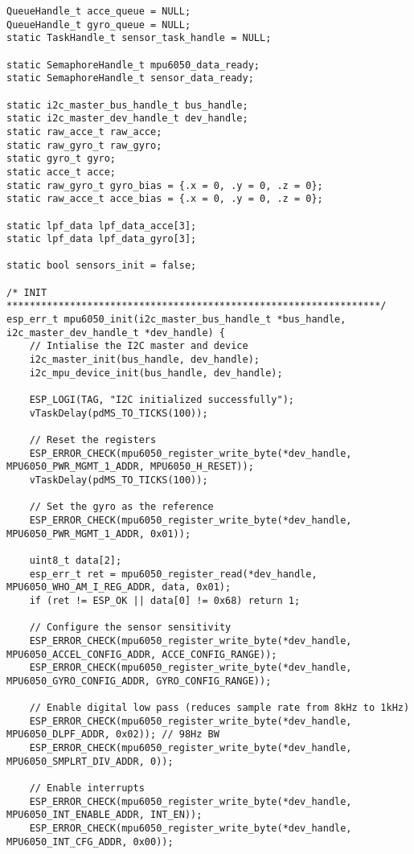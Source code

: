\begin{lstlisting}[caption={Register Read}]
QueueHandle_t acce_queue = NULL;
QueueHandle_t gyro_queue = NULL;
static TaskHandle_t sensor_task_handle = NULL;

static SemaphoreHandle_t mpu6050_data_ready;
static SemaphoreHandle_t sensor_data_ready;

static i2c_master_bus_handle_t bus_handle;
static i2c_master_dev_handle_t dev_handle;
static raw_acce_t raw_acce; 
static raw_gyro_t raw_gyro;
static gyro_t gyro;
static acce_t acce;
static raw_gyro_t gyro_bias = {.x = 0, .y = 0, .z = 0};
static raw_acce_t acce_bias = {.x = 0, .y = 0, .z = 0};

static lpf_data lpf_data_acce[3];
static lpf_data lpf_data_gyro[3];

static bool sensors_init = false;

/* INIT *****************************************************************/
esp_err_t mpu6050_init(i2c_master_bus_handle_t *bus_handle, i2c_master_dev_handle_t *dev_handle) {
    // Intialise the I2C master and device
    i2c_master_init(bus_handle, dev_handle);
    i2c_mpu_device_init(bus_handle, dev_handle);

    ESP_LOGI(TAG, "I2C initialized successfully");
    vTaskDelay(pdMS_TO_TICKS(100)); 
    
    // Reset the registers
    ESP_ERROR_CHECK(mpu6050_register_write_byte(*dev_handle, MPU6050_PWR_MGMT_1_ADDR, MPU6050_H_RESET));
    vTaskDelay(pdMS_TO_TICKS(100)); 
    
    // Set the gyro as the reference
    ESP_ERROR_CHECK(mpu6050_register_write_byte(*dev_handle, MPU6050_PWR_MGMT_1_ADDR, 0x01));

    uint8_t data[2];
    esp_err_t ret = mpu6050_register_read(*dev_handle, MPU6050_WHO_AM_I_REG_ADDR, data, 0x01);
    if (ret != ESP_OK || data[0] != 0x68) return 1;
        
    // Configure the sensor sensitivity
    ESP_ERROR_CHECK(mpu6050_register_write_byte(*dev_handle, MPU6050_ACCEL_CONFIG_ADDR, ACCE_CONFIG_RANGE));
    ESP_ERROR_CHECK(mpu6050_register_write_byte(*dev_handle, MPU6050_GYRO_CONFIG_ADDR, GYRO_CONFIG_RANGE));

    // Enable digital low pass (reduces sample rate from 8kHz to 1kHz)
    ESP_ERROR_CHECK(mpu6050_register_write_byte(*dev_handle, MPU6050_DLPF_ADDR, 0x02)); // 98Hz BW
    ESP_ERROR_CHECK(mpu6050_register_write_byte(*dev_handle, MPU6050_SMPLRT_DIV_ADDR, 0));

    // Enable interrupts
    ESP_ERROR_CHECK(mpu6050_register_write_byte(*dev_handle, MPU6050_INT_ENABLE_ADDR, INT_EN));
    ESP_ERROR_CHECK(mpu6050_register_write_byte(*dev_handle, MPU6050_INT_CFG_ADDR, 0x00));


\end{lstlisting}
